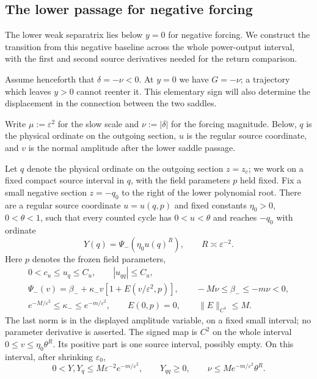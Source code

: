 \subsection{The lower passage for negative forcing}

The lower weak separatrix lies below $y=0$ for negative forcing.
We construct the transition from this negative baseline across the whole
power-output interval, with the first and second source derivatives
needed for the return comparison.

Assume henceforth that $\delta=-\nu<0$. At $y=0$ we have $G=-\nu$;
a trajectory which leaves $y>0$ cannot reenter it. This elementary sign
will also determine the displacement in the connection between the two
saddles.

Write $\mu:=\varepsilon^2$ for the slow scale and $\nu:=|\delta|$ for the
forcing magnitude. Below, $q$ is the physical ordinate on the outgoing
section, $u$ is the regular source coordinate, and $v$ is the normal
amplitude after the lower saddle passage.

\begin{lemma}\label{lem:lower-saddle-transition}
Let $q$ denote the physical ordinate on the outgoing section $z=z_c$;
we work on a fixed compact source interval in $q$, with the field
parameters $p$ held fixed.
Fix a small negative section $z=-q_0$ to the right of the lower polynomial
root. There are a regular source coordinate $u=u(q,p)$ and fixed
constants $\eta_0>0$, $0<\theta<1$, such
that every counted cycle has $0<u<\theta$ and reaches $-q_0$ with
ordinate
\begin{equation}\label{eq:lower-exact-transition}
 Y(q)=\Psi_-(\eta_0u(q)^R),\qquad
 R\asymp\varepsilon^{-2}.
\end{equation}
Here $p$ denotes the frozen field parameters,
\begin{gather}
 0<c_u\le u_q\le C_u,\qquad |u_{qq}|\le C_u,
 \label{eq:lower-regular-source}\\
 \Psi_-(v)=\beta_-+\kappa_-v[1+E(v/\varepsilon^2,p)],
 \qquad -M\nu\le\beta_-\le-m\nu<0,
 \label{eq:lower-signed-map}\\
 e^{-M/\varepsilon^2}\le\kappa_-\le e^{-m/\varepsilon^2},
 \qquad E(0,p)=0,\qquad \|E\|_{C^1}\le M .
 \label{eq:lower-signed-jets}
\end{gather}
The last norm is in the displayed amplitude variable, on a fixed small
interval; no parameter derivative is asserted. The signed map is $C^2$
on the whole interval $0\le v\le\eta_0\theta^R$. Its positive
part is one source interval, possibly empty. On this interval, after
shrinking $\varepsilon_0$,
\begin{equation}\label{eq:lower-flat-output}
 0<Y,Y_q\le M\varepsilon^{-2}e^{-m/\varepsilon^2},
 \qquad Y_{qq}\ge0,\qquad
 \nu\le M e^{-m/\varepsilon^2}\theta^R .
\end{equation}
\end{lemma}


